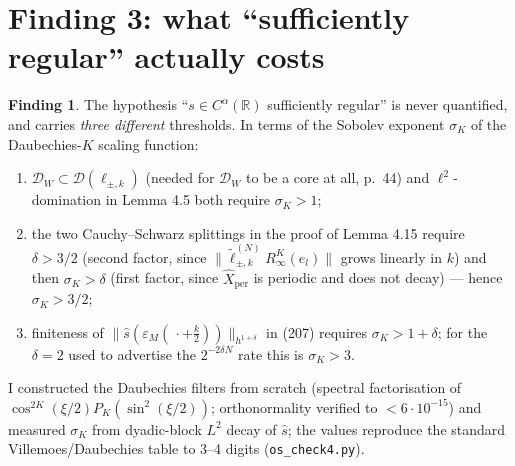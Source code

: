 \documentclass[11pt,a4paper]{article}
\theoremstyle{definition}
\newtheorem{finding}{Finding}
\newcommand{\eps}{\varepsilon}
\newcommand{\DW}{\mathcal{D}_W}
\newcommand{\sh}{\hat{s}}
\begin{document}
\section{Finding 3: what ``sufficiently regular'' actually costs}\label{sec:reg}

\begin{finding}
The hypothesis ``$s\in C^\alpha(\mathbb R)$ sufficiently regular'' is never quantified, and
carries \emph{three different} thresholds. In terms of the Sobolev exponent $\sigma_K$ of the
Daubechies-$K$ scaling function:
\begin{enumerate}[label=(\alph*),leftmargin=1.9em,itemsep=1pt]
\item $\DW\subset\mathcal D(\ell_{\pm,k})$ (needed for $\DW$ to be a core at all, p.~44) and
$\ell^2$-domination in Lemma 4.5 both require $\sigma_K>1$;
\item the two Cauchy--Schwarz splittings in the proof of Lemma 4.15 require $\delta>3/2$
(second factor, since $\|\tilde\ell^{(N)}_{\pm,k}R^K_\infty(e_l)\|$ grows linearly in $k$) and
then $\sigma_K>\delta$ (first factor, since $\hat X_{\mathrm{per}}$ is periodic and does not
decay) --- hence $\sigma_K>3/2$;
\item finiteness of $\|\sh(\eps_M(\,\cdot+\tfrac k2))\|_{h^{1+\delta}}$ in (207) requires
$\sigma_K>1+\delta$; for the $\delta=2$ used to advertise the $2^{-2\delta N}$ rate this is
$\sigma_K>3$.
\end{enumerate}
\end{finding}

\noindent
I constructed the Daubechies filters from scratch (spectral factorisation of
$\cos^{2K}(\xi/2)P_K(\sin^2(\xi/2))$; orthonormality verified to $<6\cdot10^{-15}$) and measured
$\sigma_K$ from dyadic-block $L^2$ decay of $\sh$; the values reproduce the standard
Villemoes/Daubechies table to 3--4 digits (\texttt{os\_check4.py}).
\end{document}
